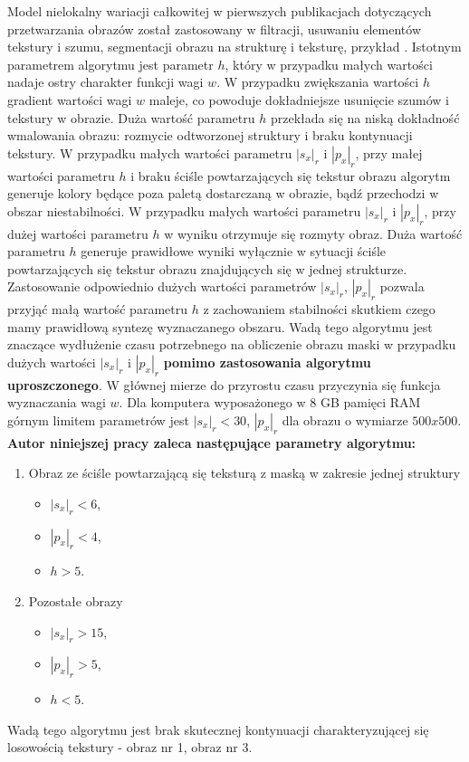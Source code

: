 \documentclass[a4paper,12pt,twoside,openany]{report}
\def \fullkotmyszm{obraz nr 1}
\def \fullObrIm{obraz nr 3}
\begin{document}
Model nielokalny wariacji całkowitej w pierwszych publikacjach dotyczących przetwarzania obrazów został zastosowany w filtracji, usuwaniu elementów tekstury i szumu, segmentacji obrazu na strukturę i teksturę, przykład \cite{buades2005non}.
Istotnym parametrem algorytmu jest parametr $h$, który w przypadku małych wartości nadaje ostry charakter funkcji wagi $w$. W przypadku zwiększania wartości $h$ gradient wartości wagi $w$ maleje, co powoduje dokładniejsze usunięcie szumów i tekstury w obrazie. Duża wartość parametru $h$ przekłada się na niską dokładność wmalowania obrazu: rozmycie odtworzonej struktury i braku kontynuacji tekstury. W przypadku małych wartości parametru $|s_x|_r$ i $|p_x|_r$, przy małej wartości parametru $h$ i braku ściśle powtarzających się tekstur obrazu algorytm generuje kolory będące poza paletą dostarczaną w obrazie, bądź przechodzi w obszar niestabilności. W przypadku małych wartości parametru  $|s_x|_r$ i $|p_x|_r$, przy dużej wartości parametru $h$ w wyniku otrzymuje się rozmyty obraz. Duża wartość parametru $h$ generuje prawidłowe wyniki wyłącznie w sytuacji ściśle powtarzających się tekstur obrazu znajdujących się w jednej strukturze. Zastosowanie odpowiednio dużych wartości parametrów $|s_x|_r$, $|p_x|_r$ pozwala przyjąć małą wartość parametru $h$ z zachowaniem stabilności skutkiem czego mamy prawidłową syntezę wyznaczanego obszaru.
Wadą tego algorytmu jest znaczące wydłużenie czasu potrzebnego na obliczenie obrazu maski w przypadku dużych wartości $|s_x|_r$ i $|p_x|_r$ \textbf{pomimo zastosowania algorytmu uproszczonego}. W głównej mierze do przyrostu czasu przyczynia się funkcja wyznaczania wagi $w$. Dla komputera wyposażonego w 8 GB pamięci RAM górnym limitem parametrów jest $|s_x|_r <30$, $|p_x|_r$ dla obrazu o wymiarze $500x500$. \textbf{Autor niniejszej pracy zaleca następujące parametry algorytmu:}
\begin{enumerate}
\item Obraz ze ściśle powtarzającą się teksturą z maską w zakresie jednej struktury
\begin{itemize}
\item $|s_x|_r < 6$,
\item $|p_x|_r < 4$,
\item $h > 5$.
\end{itemize}
\item Pozostałe obrazy
\begin{itemize}
\item $|s_x|_r > 15$,
\item $|p_x|_r > 5$,
\item $h < 5$.
\end{itemize}
\end{enumerate}
Wadą tego algorytmu jest brak skutecznej kontynuacji charakteryzującej się losowością tekstury - \fullkotmyszm, \fullObrIm .
\end{document}

